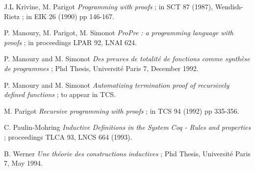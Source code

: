 \begin{thebibliography}{9999}
 J.L Krivine, M. Parigot
 {\it Programming with proofs} ; in SCT 87 (1987),
Wendish-Rietz ; in EIK 26 (1990) pp 146-167.

 P. Manoury, M. Parigot, M. Simonot {\it {\sf
ProPre} : a programming language with proofs} ; in
proceedings LPAR 92, LNAI 624.

 P. Manoury and M. Simonot {\it Des preuves
de totalit\'e de fonctions comme synth\`ese de
programmes} ; Phd Thesis, Universit\'e Paris 7, December
1992. 

 P. Manoury and M. Simonot {\it
Automatizing termination proof of recursively defined
functions} ; to appear in TCS.

 M. Parigot {\it Recursive programming with
proofs} ; in TCS 94 (1992) pp 335-356. 

 C. Paulin-Mohring {\it Inductive
Definitions in the System Coq - Rules and properties} ;
proceedings TLCA 93, LNCS 664 (1993).

 B. Werner {\it Une th\'eorie des
constructions inductives} ; Phd Thesis, Universit\'e Paris
7, May 1994.

\end{thebibliography}






